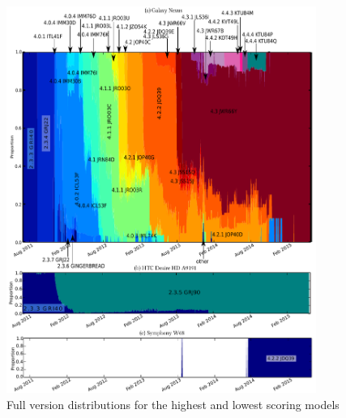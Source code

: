 \begin{figure}
 \centering
 \includegraphics[width=0.9\textwidth]{figures/full_version_comp.pdf}
 \caption{Full version distributions for the highest and lowest scoring models}
 \label{fig:full_version_comp}
\end{figure}


